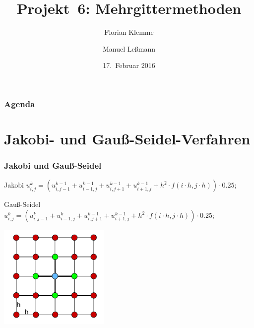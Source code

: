 \documentclass{beamer}
\begin{document}
\title{Projekt~6: Mehrgittermethoden}
\author{Florian Klemme \and Manuel Leßmann}
\date{17.~Februar 2016}

\begin{frame}
    \titlepage
\end{frame}

\begin{frame}
    \tableofcontents
    \frametitle{Agenda}
\end{frame}

\section{Jakobi- und Gauß-Seidel-Verfahren}
\begin{frame}
    \frametitle{Jakobi und Gauß-Seidel}
    \begin{block}{Jakobi}
        \(u_{i,j}^{k} = (u_{i,j-1}^{k-1} + u_{i-1,j}^{k-1}
                       + u_{i,j+1}^{k-1} + u_{i+1,j}^{k-1}
                       + h^2 \cdot f(i \cdot h, j \cdot h)) \cdot 0.25;\)
    \end{block}
    \begin{block}{Gauß-Seidel}
        \(u_{i,j}^{k} = (u_{i,j-1}^{k} + u_{i-1,j}^{k}
                       + u_{i,j+1}^{k-1} + u_{i+1,j}^{k-1}
                       + h^2 \cdot f(i \cdot h, j \cdot h)) \cdot 0.25;\)
    \end{block}
    \centering\includegraphics[width=0.4\textwidth]{jakobi-grid}
\end{frame}
\end{document}
